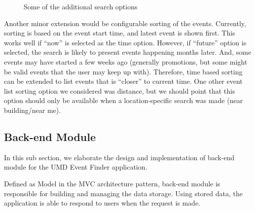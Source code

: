 \documentclass{acm_proc_article-sp}
\begin{document}
\begin{figure*}
\centering 
{}
\caption{\label{fig:screen_search_details}Some of the additional search options}
\end{figure*}

Another minor extension would be configurable sorting of the events.
Currently, sorting is based on the event start time, and latest event is shown first.
This works well if "`now"' is selected as the time option.
However, if "`future"' option is selected, the search is likely to present events happening months later.
And, some events may have started a few weeks ago (generally promotions, but some might be valid events that the user may keep up with).
Therefore, time based sorting can be extended to list events that is "`closer"' to current time.
One other event list sorting option we considered was distance, but we should point that this option should only be available when a location-specific search was made (near building/near me).



\subsection{Back-end Module}
In this sub section, we elaborate the design and implementation of back-end module for the UMD Event Finder application. 

Defined as Model in the MVC architecture pattern, back-end module is responsible for building and managing the data storage. Using stored data, the application is able to respond to users when the request is made. 
\end{document}
